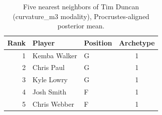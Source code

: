 \begin{table}[htbp]
  \centering\small
  \begin{tabular}{rllc}
    \toprule
    Rank & Player & Position & Archetype \\
    \midrule
    1 & Kemba Walker & G & 1 \\
    2 & Chris Paul & G & 1 \\
    3 & Kyle Lowry & G & 1 \\
    4 & Josh Smith & F & 1 \\
    5 & Chris Webber & F & 1 \\
    \bottomrule
  \end{tabular}
  \caption{Five nearest neighbors of Tim Duncan (curvature_m3 modality), Procrustes-aligned posterior mean.}
  \label{tab:Tim_Duncan_neighbors_curvature_m3}
\end{table}

